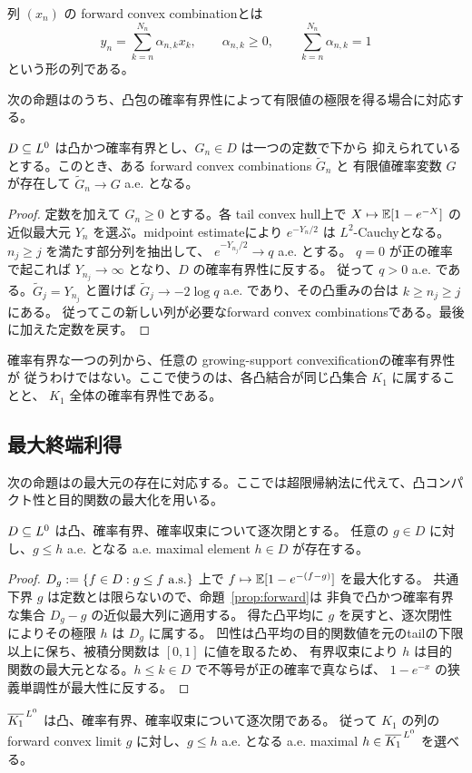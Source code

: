 列 $(x_n)$ の forward convex combinationとは
\[
 y_n=\sum_{k=n}^{N_n}\alpha_{n,k}x_k,
 \qquad
 \alpha_{n,k}\geq0,
 \qquad
 \sum_{k=n}^{N_n}\alpha_{n,k}=1
\]
という形の列である。

次の命題は\cite[Lemma A1.1]{DS}のうち、凸包の確率有界性によって有限値の極限を得る場合に対応する。

\begin{proposition}
\label{prop:forward}
$D\subseteq L^0$ は凸かつ確率有界とし、$G_n\in D$ は一つの定数で下から
抑えられているとする。このとき、ある forward convex combinations $\widetilde G_n$ と
有限値確率変数 $G$ が存在して $\widetilde G_n\to G$ a.e. となる。
\end{proposition}

\begin{proof}
定数を加えて $G_n\geq0$ とする。各 tail convex hull上で
$X\mapsto\mathbb E[1-e^{-X}]$ の近似最大元 $Y_n$ を選ぶ。midpoint estimateにより
$e^{-Y_n/2}$ は $L^2$-Cauchyとなる。$n_j\geq j$ を満たす部分列を抽出して、
$e^{-Y_{n_j}/2}\to q$ a.e. とする。
$q=0$ が正の確率で起これば $Y_{n_j}\to\infty$ となり、$D$ の確率有界性に反する。
従って $q>0$ a.e. である。$\widetilde G_j=Y_{n_j}$ と置けば
$\widetilde G_j\to-2\log q$ a.e. であり、その凸重みの台は $k\geq n_j\geq j$ にある。
従ってこの新しい列が必要なforward convex combinationsである。最後に加えた定数を戻す。
\end{proof}

確率有界な一つの列から、任意の growing-support convexificationの確率有界性が
従うわけではない。ここで使うのは、各凸結合が同じ凸集合 $K_1$ に属することと、
$K_1$ 全体の確率有界性である。

\subsection{最大終端利得}

次の命題は\cite[Lemma 4.3]{DS}の最大元の存在に対応する。ここでは超限帰納法に代えて、凸コンパクト性と目的関数の最大化を用いる。

\begin{proposition}
\label{prop:maximal}
$D\subseteq L^0$ は凸、確率有界、確率収束について逐次閉とする。
任意の $g\in D$ に対し、$g\leq h$ a.e. となる a.e. maximal element $h\in D$ が存在する。
\end{proposition}

\begin{proof}
$D_g:=\{f\in D:g\leq f\ \as\}$ 上で
$f\mapsto\mathbb E[1-e^{-(f-g)}]$ を最大化する。
共通下界 $g$ は定数とは限らないので、命題~\ref{prop:forward}は
非負で凸かつ確率有界な集合 $D_g-g$ の近似最大列に適用する。
得た凸平均に $g$ を戻すと、逐次閉性によりその極限 $h$ は $D_g$ に属する。
凹性は凸平均の目的関数値を元のtailの下限以上に保ち、被積分関数は $[0,1]$ に値を取るため、
有界収束により $h$ は目的関数の最大元となる。$h\leq k\in D$ で不等号が正の確率で真ならば、
$1-e^{-x}$ の狭義単調性が最大性に反する。
\end{proof}

$\overline{K_1}^{\,L^0}$ は凸、確率有界、確率収束について逐次閉である。
従って $K_1$ の列の forward convex limit $g$ に対し、$g\leq h$ a.e. となる
a.e. maximal $h\in\overline{K_1}^{\,L^0}$ を選べる。
